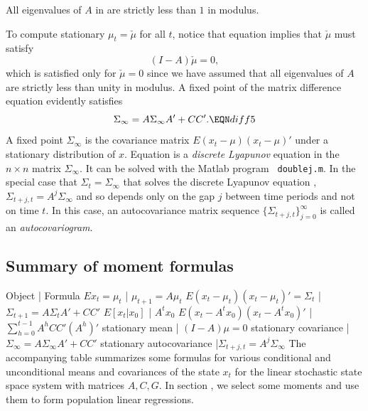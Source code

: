\medskip
{}  All  eigenvalues of $A$ in
 are strictly less than $1$ in modulus.

\medskip

\noindent To compute stationary $\mu_t = \check \mu$ for all $t$, notice that
equation  implies that $\check \mu$ must satisfy
$$ (I - A) \check \mu = 0 , $$
which is satisfied only for $\check \mu =0 $ since we have assumed that
all eigenvalues of $A$ are strictly less than unity in modulus.
A fixed point of the matrix difference equation  evidently  satisfies
$$ \Sigma_\infty = A \Sigma_\infty A' + C C' .  \EQN diff5 $$
A fixed point $ \Sigma_\infty  $
 is the covariance matrix $E (x_t -\mu) (x_t - \mu)'$ under  a stationary distribution of $x$.
%
Equation  is
a {\it discrete Lyapunov} equation in the $n \times n$ matrix
$\Sigma_\infty$.  It can be solved with the Matlab program {\tt
doublej.m}. %
%
In the special case that $\Sigma_t = \Sigma_\infty$ that solves the discrete Lyapunov equation
, $\Sigma_{t+j,t} = A^j \Sigma_\infty$ and so depends only on the gap $j$ between time
periods and not on time $t$. In this case, an autocovariance  matrix sequence $\{\Sigma_{t+j,t}\}_{j=0}^\infty$ is  called an {\it
autocovariogram}.  %


\subsection{Summary of moment formulas}\label{sec:summarymoments}
\medskip



Object | Formula \cr
$E x_t = \mu_t$   |  $ \mu_{t+1} = A \mu_t$ \nr
$E (x_t - \mu_t)(x_t - \mu_t)' = \Sigma_t$ | $\Sigma_{t+1} = A \Sigma_{t} A' + C C' $ \cr
 $E [x_t\vert x_0] $ | $A^t x_0$ \nr
$E(x_t - A^t x_0)(x_t - A^t x_0)'$ | $\sum_{h=0}^{t-1} A^h C C' (A^h)'$ \cr
stationary mean | $(I - A)\mu =0$ \nr
stationary covariance | $\Sigma_\infty = A \Sigma_\infty A' + C C' $ \nr
stationary autocovariance |$ \Sigma_{t+j,t} = A^j \Sigma_\infty$
\endruledtable
\medskip
\noindent The accompanying table summarizes some formulas for various conditional and unconditional means  and covariances of
the state $x_t$  for the  linear stochastic state space system with matrices  $A, C, G$.
In section , we select some moments and use them to form  population linear regressions.


